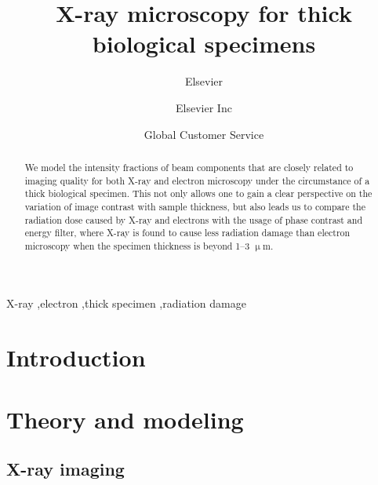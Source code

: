 \documentclass[review]{elsarticle}
\newcommand\micron{$\upmu$m}
\begin{document}
\begin{frontmatter}

\title{X-ray microscopy for thick biological specimens}

\author{Elsevier}
\address{Radarweg 29, Amsterdam}

\author[mymainaddress,mysecondaryaddress]{Elsevier Inc}

\author[mysecondaryaddress]{Global Customer Service}

\address[mymainaddress]{1600 John F Kennedy Boulevard, Philadelphia}
\address[mysecondaryaddress]{360 Park Avenue South, New York}


\begin{abstract}
We model the intensity fractions of beam components that are closely related to imaging quality for both X-ray and electron microscopy under the circumstance of a thick biological specimen. This not only allows one to gain a clear perspective on the variation of image contrast with sample thickness, but also leads us to compare the radiation dose caused by X-ray and electrons with the usage of phase contrast and energy filter, where X-ray is found to cause less radiation damage than electron microscopy when the specimen thickness is beyond 1--3 \micron. 
\end{abstract}

\begin{keyword}
X-ray \sep electron \sep thick specimen \sep radiation damage
\end{keyword}

\end{frontmatter}

\linenumbers

\section{Introduction}

\section{Theory and modeling}

\subsection{X-ray imaging}
\end{document}
